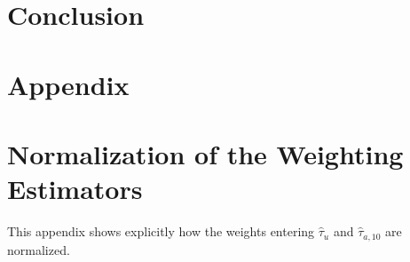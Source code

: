 \documentclass[12pt, a4paper, oneside]{article}
\theoremstyle{plain}
\theoremstyle{definition}
\begin{document}
\section{Conclusion}
\label{sec:conclusion}



\newpage


\newpage
\section{Appendix}
\appendix
\renewcommand{\thesection}{\Alph{section}}


\section{Normalization of the Weighting Estimators}
\label{app:normalization_estimators}
This appendix shows explicitly how the weights entering
$\widehat{\tau}_u$ and $\widehat{\tau}_{a,10}$ are normalized. 
\end{document}
